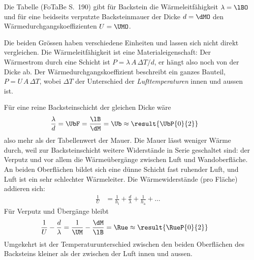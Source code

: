 Die Tabelle (FoTaBe S.~190) gibt für Backstein die Wärmeleitfähigkeit $\lambda = \lBO$ und für eine beidseits verputzte Backsteinmauer der Dicke $d = \dMO$ den Wärmedurchgangskoeffizienten $U = \UMO$.

Die beiden Grössen haben verschiedene Einheiten und lassen sich nicht direkt vergleichen. Die Wärmeleitfähigkeit ist eine Materialeigenschaft: Der Wärmestrom durch eine Schicht ist $P = \lambda\,A\,\Delta T/d$, er hängt also noch von der Dicke ab. Der Wärmedurchgangskoeffizient beschreibt ein ganzes Bauteil, $P = U\,A\,\Delta T$, wobei $\Delta T$ der Unterschied der \emph{Lufttemperaturen} innen und aussen ist.

Für eine reine Backsteinschicht der gleichen Dicke wäre
\begin{align}
 \frac{\lambda}{d} &= \UbF = \frac{\lB}{\dM} = \Ub \approx \result{\UbP{0}{2}}
\end{align}
also mehr als der Tabellenwert der Mauer. Die Mauer lässt weniger Wärme durch, weil zur Backsteinschicht weitere Widerstände in Serie geschaltet sind: der Verputz und vor allem die Wärmeübergänge zwischen Luft und Wandoberfläche. An beiden Oberflächen bildet sich eine dünne Schicht fast ruhender Luft, und Luft ist ein sehr schlechter Wärmeleiter. Die Wärmewiderstände (pro Fläche) addieren sich:
\begin{align}
 \frac{1}{U} &= \frac{1}{h_\text{i}} + \frac{d}{\lambda} + \frac{1}{h_\text{a}} + \ldots
\end{align}
Für Verputz und Übergänge bleibt
\begin{align}
 \frac{1}{U}-\frac{d}{\lambda} &= \frac{1}{\UM}-\frac{\dM}{\lB} = \Rue \approx \result{\RueP{0}{2}}
\end{align}
Umgekehrt ist der Temperaturunterschied zwischen den beiden Oberflächen des Backsteins kleiner als der zwischen der Luft innen und aussen.
